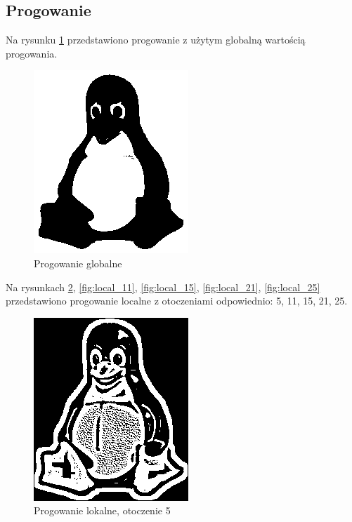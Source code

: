 \documentclass[12pt, a4paper]{article}
\begin{document}
\subsection{Progowanie}
Na rysunku \ref{fig:global} przedstawiono progowanie z użytym globalną wartością progowania.
\begin{figure}[p]
\includegraphics{global}
\caption{Progowanie globalne}
\label{fig:global}
\end{figure}
Na rysunkach \ref{fig:local_5}, \ref{fig:local_11}, \ref{fig:local_15}, \ref{fig:local_21}, \ref{fig:local_25} przedstawiono progowanie localne z otoczeniami odpowiednio: 5, 11, 15, 21, 25.\\
\begin{figure}[p]
\includegraphics{local_5}
\caption{Progowanie lokalne, otoczenie 5}
\label{fig:local_5}
\end{figure}
\end{document}
